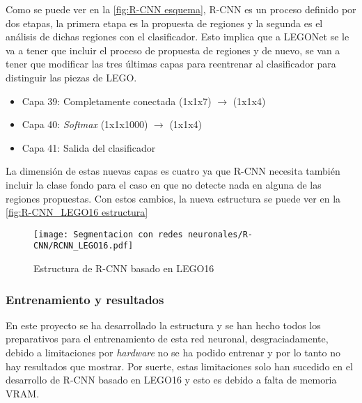 Como se puede ver en la \autoref{fig:R-CNN esquema}, R-CNN es un proceso definido por dos etapas, la primera etapa es la propuesta de regiones y la segunda es el análisis de dichas regiones con el clasificador. Esto implica que a LEGONet se le va a tener que incluir el proceso de propuesta de regiones y de nuevo, se van a tener que modificar las tres últimas capas para reentrenar al clasificador para distinguir las piezas de LEGO.

\begin{itemize}
\item Capa 39: Completamente conectada (1x1x7) $\rightarrow$ (1x1x4)
\item Capa 40: \textit{Softmax} (1x1x1000) $\rightarrow$ (1x1x4)
\item Capa 41: Salida del clasificador
\end{itemize}

La dimensión de estas nuevas capas es cuatro ya que R-CNN necesita también incluir la clase fondo para el caso en que no detecte nada en alguna de las regiones propuestas. Con estos cambios, la nueva estructura se puede ver en la \autoref{fig:R-CNN_LEGO16 estructura}

\begin{figure}[ht]  %
	\centering
	\texttt{[image: Segmentacion con redes neuronales/R-CNN/RCNN\_LEGO16.pdf]}
	\caption{Estructura de R-CNN basado en LEGO16}
	\label{fig:R-CNN_LEGO16 estructura}
\end{figure}

\subsubsection*{Entrenamiento y resultados}
En este proyecto se ha desarrollado la estructura y se han hecho todos los preparativos para el entrenamiento de esta red neuronal, desgraciadamente, debido a limitaciones por \textit{hardware} no se ha podido entrenar y por lo tanto no hay resultados que mostrar. Por suerte, estas limitaciones solo han sucedido en el desarrollo de R-CNN basado en LEGO16 y esto es debido a falta de memoria VRAM.

